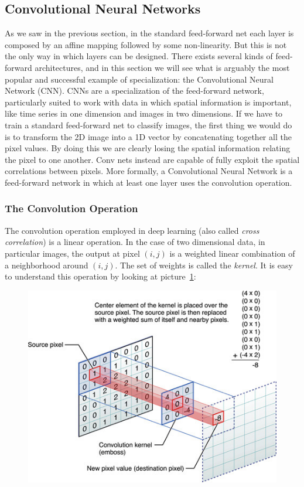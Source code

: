 \documentclass[../main.tex]{subfiles}
\begin{document}
    \subsection{Convolutional Neural Networks}
    As we saw in the previous section, in the standard feed-forward net each layer is composed by an affine mapping followed by some non-linearity.
    But this is not the only way in which layers can be designed. There exists several kinds of feed-forward architectures, and in this section
    we will see what is arguably the most popular and successful example of specialization: the Convolutional Neural Network (CNN).
    \newline
    CNNs are a specialization of the feed-forward network, particularly suited to work with data in which spatial information is important, like
    time series in one dimension and images in two dimensions. If we have to train a standard feed-forward net to classify images, the first
    thing we would do is to transform the 2D image into a 1D vector by concatenating together all the pixel values. By doing this we are
    clearly losing the spatial information relating the pixel to one another. Conv nets instead are capable of fully exploit the spatial
    correlations between pixels.
    \newline
    More formally, a Convolutional Neural Network is a feed-forward network in which at least one layer uses the convolution operation.

    \subsubsection{The Convolution Operation}
    The convolution operation employed in deep learning (also called \textit{cross correlation}) is a linear operation.
    In the case of two dimensional data, in particular images, the output at pixel $(i, j)$ is a weighted linear combination
    of a neighborhood around $(i, j)$. The set of weights is called the \textit{kernel}. It is easy to understand this operation
    by looking at picture~\ref{fig:convolution-op}:

    \begin{figure}[h!]
        \centering
    	\includegraphics[width=.8\linewidth]{img/convolution-op.png}
        \label{fig:convolution-op}
	\end{figure}
\end{document}
